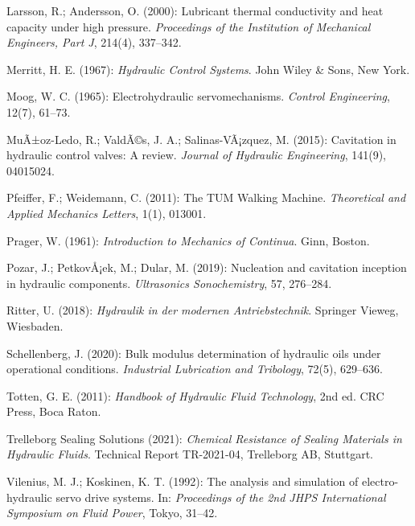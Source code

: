 ﻿\documentclass[a4paper,12pt]{scrreprt}
\theoremstyle{definition}
\begin{document}
\begin{enumerate}[label={[\arabic*]}]
  \item Larsson, R.; Andersson, O. (2000): Lubricant thermal
    conductivity and heat capacity under high pressure.
    \textit{Proceedings of the Institution of Mechanical Engineers,
    Part J}, 214(4), 337--342.

  \item Merritt, H. E. (1967): \textit{Hydraulic Control Systems}.
    John Wiley \& Sons, New York.

  \item Moog, W. C. (1965): Electrohydraulic servomechanisms.
    \textit{Control Engineering}, 12(7), 61--73.

  \item MuÃ±oz-Ledo, R.; ValdÃ©s, J. A.; Salinas-VÃ¡zquez, M. (2015):
    Cavitation in hydraulic control valves: A review.
    \textit{Journal of Hydraulic Engineering}, 141(9), 04015024.

  \item Pfeiffer, F.; Weidemann, C. (2011): The TUM Walking Machine.
    \textit{Theoretical and Applied Mechanics Letters}, 1(1), 013001.

  \item Prager, W. (1961): \textit{Introduction to Mechanics of
    Continua}. Ginn, Boston.

  \item Pozar, J.; PetkovÅ¡ek, M.; Dular, M. (2019): Nucleation and
    cavitation inception in hydraulic components. \textit{Ultrasonics
    Sonochemistry}, 57, 276--284.

  \item Ritter, U. (2018): \textit{Hydraulik in der modernen
    Antriebstechnik}. Springer Vieweg, Wiesbaden.

  \item Schellenberg, J. (2020): Bulk modulus determination of
    hydraulic oils under operational conditions.
    \textit{Industrial Lubrication and Tribology}, 72(5), 629--636.

  \item Totten, G. E. (2011): \textit{Handbook of Hydraulic Fluid
    Technology}, 2nd ed. CRC Press, Boca Raton.

  \item Trelleborg Sealing Solutions (2021): \textit{Chemical
    Resistance of Sealing Materials in Hydraulic Fluids}.
    Technical Report TR-2021-04, Trelleborg AB, Stuttgart.

  \item Vilenius, M. J.; Koskinen, K. T. (1992): The analysis and
    simulation of electro-hydraulic servo drive systems.
    In: \textit{Proceedings of the 2nd JHPS International Symposium
    on Fluid Power}, Tokyo, 31--42.


\end{enumerate}
\end{document}
